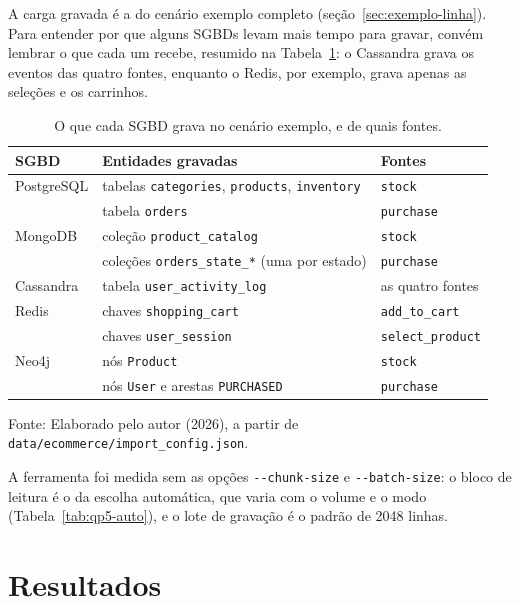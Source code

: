 A carga gravada é a do cenário exemplo completo (seção~\ref{sec:exemplo-linha}). Para
entender por que alguns SGBDs levam mais tempo para gravar, convém lembrar o que cada um
recebe, resumido na Tabela~\ref{tab:carga-sgbd}: o Cassandra grava os eventos das quatro
fontes, enquanto o Redis, por exemplo, grava apenas as seleções e os carrinhos.

\begin{table}[H]
  \caption{O que cada SGBD grava no cenário exemplo, e de quais fontes.}
  \label{tab:carga-sgbd}
  \centering
  \begin{tabular}{l l l}
    \toprule
    \textbf{SGBD} & \textbf{Entidades gravadas} & \textbf{Fontes} \\
    \midrule
    PostgreSQL & tabelas \texttt{categories}, \texttt{products}, \texttt{inventory} & \texttt{stock} \\
               & tabela \texttt{orders} & \texttt{purchase} \\
    MongoDB    & coleção \texttt{product\_catalog} & \texttt{stock} \\
               & coleções \texttt{orders\_state\_*} (uma por estado) & \texttt{purchase} \\
    Cassandra  & tabela \texttt{user\_activity\_log} & as quatro fontes \\
    Redis      & chaves \texttt{shopping\_cart} & \texttt{add\_to\_cart} \\
               & chaves \texttt{user\_session} & \texttt{select\_product} \\
    Neo4j      & nós \texttt{Product} & \texttt{stock} \\
               & nós \texttt{User} e arestas \texttt{PURCHASED} & \texttt{purchase} \\
    \bottomrule
  \end{tabular}
  \par\vspace{4pt}
  {\footnotesize Fonte: Elaborado pelo autor (2026), a partir de \texttt{data/ecommerce/import\_config.json}.}
\end{table}

A ferramenta foi medida sem as opções \texttt{-{}-chunk-size} e \texttt{-{}-batch-size}:
o bloco de leitura é o da escolha automática, que varia com o volume e o modo
(Tabela~\ref{tab:qp5-auto}), e o lote de gravação é o padrão de \num{2048} linhas.

\section{Resultados}
\label{sec:resultados}

